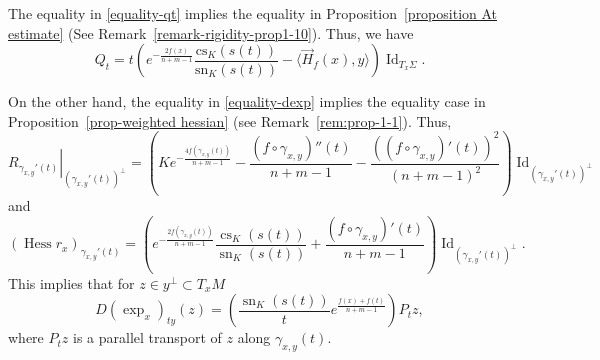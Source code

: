 \documentclass[psamsfonts]{amsart}
\theoremstyle{definition}
\theoremstyle{remark}
\numberwithin{equation}{section}
\begin{document}
The equality in \eqref{equality-qt} implies the equality in Proposition~\ref{proposition At estimate} (See Remark~\ref{remark-rigidity-prop1-10}).
Thus, we have
\begin{equation}\label{Qt-equality}
    Q_t = t\left(e^{-\frac{2f(x)}{n+m-1}} \frac{\mathrm{cs}_K(s(t))}{\mathrm{sn}_K(s(t))} - \langle \vec H_f(x) , y\rangle\right)\operatorname{Id}_{T_x\Sigma}.
\end{equation}

On the other hand, the equality in \eqref{equality-dexp} implies the equality case in Proposition~\ref{prop-weighted hessian} (see Remark~\ref{rem:prop-1-1}). Thus,
$$\left.R_{\gamma_{x,y}'(t)}\right|_{(\gamma_{x,y}'(t))^\perp} = \left( K e^{-\frac{4f(\gamma_{x,y}(t))}{n+m -1}} - \frac{(f\circ\gamma_{x,y})''(t)}{n+m -1} - \frac{((f\circ \gamma_{x,y})'(t))^2}{(n+m -1)^2} \right) \operatorname{Id}_{(\gamma_{x,y}'(t))^\perp}$$
and
$$(\operatorname{Hess} r_x)_{\gamma_{x,y}'(t)}  = \left(e^{- \frac{2f(\gamma_{x,y}(t))}{n+m-1}} \frac{\operatorname{cs}_K(s(t))}{\operatorname{sn}_K(s(t))} + \frac{(f \circ\gamma_{x,y})'(t)}{n+m-1}\right)\operatorname{Id}_{(\gamma_{x,y}'(t))^\perp}.$$
This implies that for $z \in y^\perp \subset T_x M$
\begin{equation}\label{Et-equality}
    D (\exp_x)_{ty}(z) = \left( \frac{\operatorname{sn}_K(s(t))}{t} e^{\frac{f(x) + f(t)}{n+m-1}}\right)P_tz,
\end{equation}
where $P_tz$ is a parallel transport of $z$ along $\gamma_{x,y}(t)$.
\end{document}
